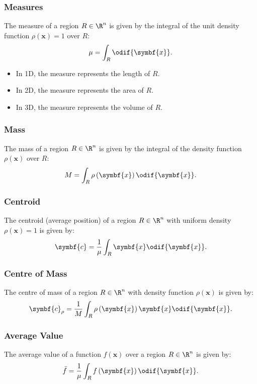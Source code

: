 \documentclass{article}
\begin{document}
\subsubsection{Measures}
The measure of a region \(R \in \R^n\) is given by the integral of the
unit density function \(\rho\left( \symbf{x} \right) = 1\) over \(R\):
\begin{equation*}
    \mu = \int_R \odif{\symbf{x}}.
\end{equation*}
\begin{itemize}
    \item In 1D, the measure represents the length of \(R\).
    \item In 2D, the measure represents the area of \(R\).
    \item In 3D, the measure represents the volume of \(R\).
\end{itemize}
\subsubsection{Mass}
The mass of a region \(R \in \R^n\) is given by the integral of the
density function \(\rho\left( \symbf{x} \right)\) over \(R\):
\begin{equation*}
    M = \int_R \rho\left( \symbf{x} \right) \odif{\symbf{x}}.
\end{equation*}
\subsubsection{Centroid}
The centroid (average position) of a region \(R \in \R^n\) with uniform
density \(\rho\left( \symbf{x} \right) = 1\) is given by:
\begin{equation*}
     \symbf{c} = \frac{1}{\mu} \int_R \symbf{x} \odif{\symbf{x}}.
\end{equation*}
\subsubsection{Centre of Mass}
The centre of mass of a region \(R \in \R^n\) with density function
\(\rho\left( \symbf{x} \right)\) is given by:
\begin{equation*}
    \symbf{c}_{\rho} = \frac{1}{M} \int_R \rho\left( \symbf{x} \right) \symbf{x} \odif{\symbf{x}}.
\end{equation*}
\subsubsection{Average Value}
The average value of a function \(f\left( \symbf{x} \right)\) over a
region \(R \in \R^n\) is given by:
\begin{equation*}
    \bar{f} = \frac{1}{\mu} \int_R f\left( \symbf{x} \right) \odif{\symbf{x}}.
\end{equation*}
\end{document}
